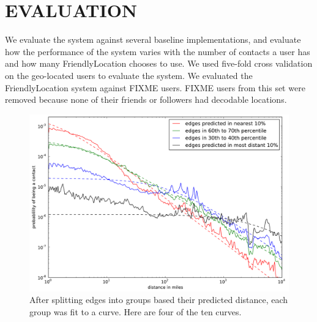 \chapter{\uppercase{Evaluation}}
We evaluate the system against several baseline implementations, and evaluate
how the performance of the system varies with the number of contacts a user has
and how many FriendlyLocation chooses to use.
We used five-fold cross validation on the geo-located users to evaluate the system.
We evaluated the FriendlyLocation system against FIXME users.
FIXME users from this set were removed because none of their friends or
followers had decodable locations.


\begin{figure}[tb]
\centering
\includegraphics[width=\linewidth]{figures/near_prob_fit.pdf}
\caption{
After splitting edges into groups based their predicted distance, each group was fit to a curve. Here are four of the ten curves.
}
\label{fig:NearProbFit}
\end{figure}

